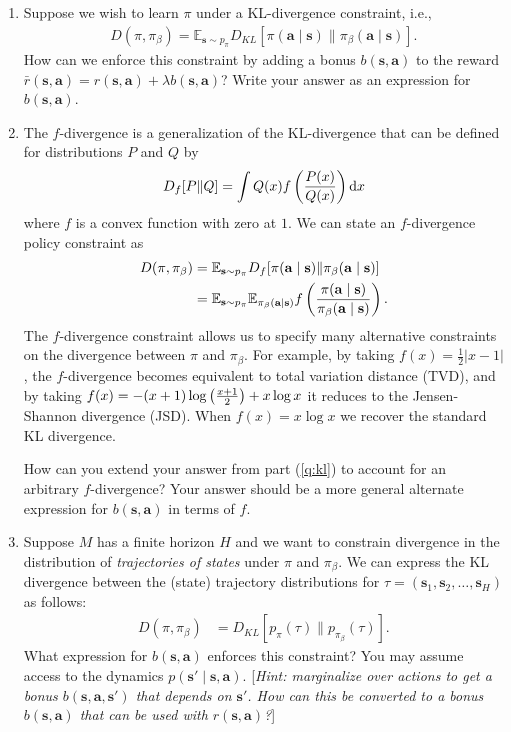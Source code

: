 \documentclass{article}
\def\s{\mathbf{s}}
\def\a{\mathbf{a}}
\def\E{\mathbb{E}}
\def\pib{\pi_{\beta}}
\begin{document}
\begin{enumerate}

	\item\label{q:kl} Suppose we wish to learn $\pi$ under a KL-divergence constraint, i.e., 
	\begin{align*}
		D(\pi,\pib)=\E_{\s\sim p_\pi}D_{KL}[\pi(\a\mid\s)\|\pib(\a\mid\s)].
	\end{align*}
	How can we enforce this constraint by adding a bonus $b(\s,\a)$ to the reward $\bar r(\s,\a)=r(\s,\a)+\lambda b(\s,\a)$? Write your answer as an expression for $b(\s,\a)$.
	
	\item The $f$-divergence is a generalization of the KL-divergence that can be defined for distributions $P$ and $Q$ by $$D_f[P\|Q]=\int Q(x)f\left(P(x) \over Q(x)\right)\mathrm dx$$ where $f$ is a convex function with zero at $1$. We can state an $f$-divergence policy constraint as 
	\begin{align*}
	    D(\pi,\pib)&=\E_{\s\sim p_\pi}D_{f}[\pi(\a\mid\s)\|\pib(\a\mid\s)]\\
	    &= \E_{\s\sim p_\pi}\E_{\pib(\a\mid\s)}f\left(\pi(\a\mid\s)\over\pib(\a\mid\s)\right).
   	\end{align*}
   	The $f$-divergence constraint allows us to specify many alternative constraints on the divergence between $\pi$ and $\pib$. For example, by taking $f(x)=\frac12|x-1|$, the $f$-divergence becomes equivalent to total variation distance (TVD), and by taking $f(x)=-(x+1)\log\left(x+1\over2\right)+x\log x$ it reduces to the Jensen-Shannon divergence (JSD). When $f(x)=x\log x$ we recover the standard KL divergence.
   	
   	How can you extend your answer from part (\ref{q:kl}) to account for an arbitrary $f$-divergence? Your answer should be a more general alternate expression for $b(\s,\a)$ in terms of $f$.
	\item Suppose $M$ has a finite horizon $H$ and we want to constrain divergence in the distribution of \emph{trajectories of states} under $\pi$ and $\pib$. We can express the KL divergence between the (state) trajectory distributions for $\tau=(\s_1,\s_2,\ldots,\s_H)$ as follows:
	\begin{align*}
	    D(\pi,\pib)&=D_{KL}[p_{\pi}(\tau)\|p_{\pib}(\tau)].
   	\end{align*} 
   	What expression for $b(\s,\a)$ enforces this constraint? You may assume access to the dynamics $p(\s'\mid\s,\a)$. [\emph{Hint: marginalize over actions to get a bonus $b(\s,\a,\s')$ that depends on $\s'$. How can this be converted to a bonus $b(\s,\a)$ that can be used with $r(\s,\a)$?}]

\end{enumerate}
\end{document}
